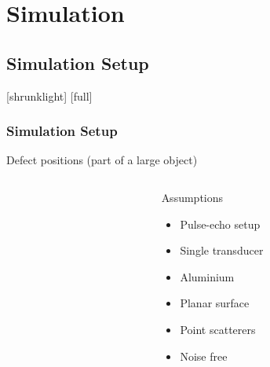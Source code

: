 \documentclass[12pt,compress,aspectratio=169]{beamer} %
\begin{document}
\section{Simulation} 

\subsection{Simulation Setup}
[shrunklight]
[full]
\begin{frame}[t]
	\frametitle{Simulation Setup}
	Defect positions (part of a large object)
	\begin{columns}[t]	
	\begin{column}{0.7\textwidth}
	\begin{center}
	\end{center}
	\end{column}		
	
	\begin{column}{0.3\textwidth}
	\begin{center}
	\vspace*{-1.2cm}
	Assumptions
	\begin{itemize}
		\item Pulse-echo setup 
		\item Single transducer
		\item Aluminium
		\item Planar surface
		\item Point scatterers
		\item Noise free
	\end{itemize}
	\end{center}
	\end{column}	
	\end{columns}	
\end{frame}
\end{document}

